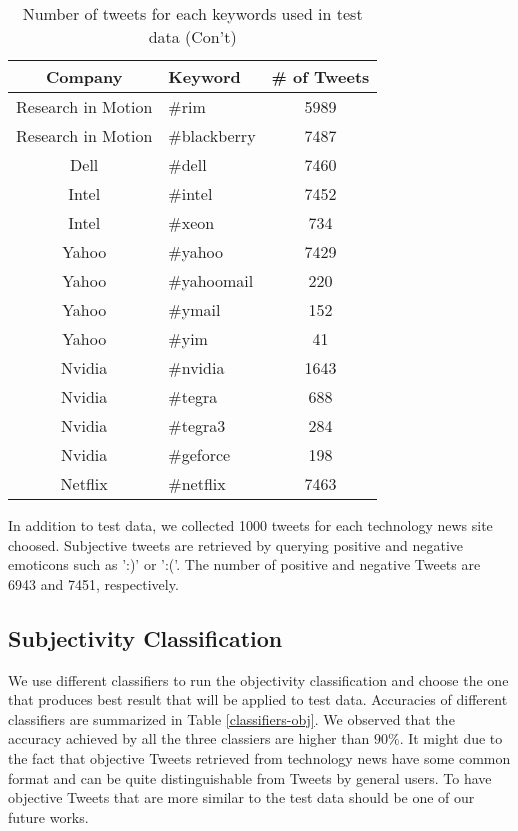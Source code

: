 \documentclass[12pt]{article}
\begin{document}
\begin{table}
\begin{center}
    \begin{tabular}{ | c || l | c | }
        \hline
        \textbf{Company} &  \textbf{Keyword} & \textbf{\# of Tweets} \\ \hline
        \hline
        Research in Motion &  \#rim & 5989 \\ \hline
        Research in Motion &  \#blackberry & 7487 \\ \hline
        Dell &  \#dell & 7460 \\ \hline
        Intel &  \#intel & 7452 \\ \hline
        Intel &  \#xeon & 734 \\ \hline
        Yahoo &  \#yahoo & 7429 \\ \hline
        Yahoo &  \#yahoomail & 220 \\ \hline
        Yahoo &  \#ymail & 152 \\ \hline
        Yahoo &  \#yim & 41 \\ \hline
        Nvidia &  \#nvidia & 1643 \\ \hline
        Nvidia &  \#tegra & 688 \\ \hline
        Nvidia &  \#tegra3 & 284 \\ \hline
        Nvidia &  \#geforce & 198 \\ \hline
        Netflix &  \#netflix & 7463 \\ \hline
        \hline
    \end{tabular}
\caption{Number of tweets for each keywords used in test data (Con't)}
\label{keywords-tweet-numbers-02}
\end{center}
\end{table}

In addition to test data, we collected 1000 tweets for each technology news site choosed. Subjective tweets are retrieved by querying positive and negative emoticons such as ':)' or ':('. The number of positive and negative Tweets are 6943 and 7451, respectively.

\subsection{Subjectivity Classification}
We use different classifiers to run the objectivity classification and choose the one that produces best result that will be applied to test data. Accuracies of different classifiers are summarized in Table \ref{classifiers-obj}. We observed that the accuracy achieved by all the three classiers are higher than $90\%$. It might due to the fact that objective Tweets retrieved from technology news have some common format and can be quite distinguishable from Tweets by general users. To have objective Tweets that are more similar to the test data should be one of our future works.
\end{document}
